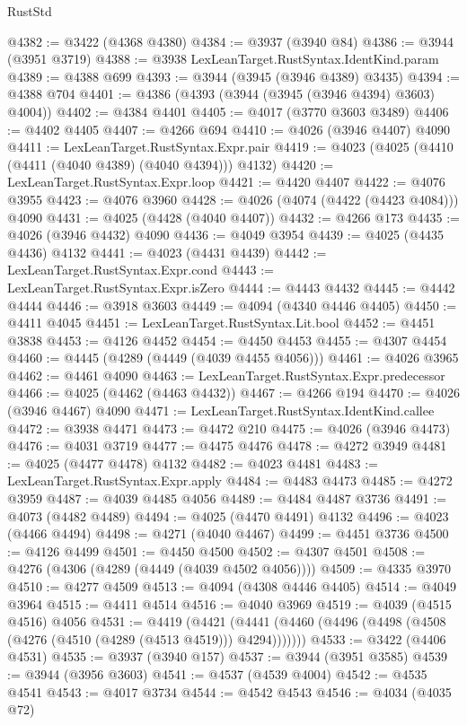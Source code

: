 \begin{lexlean}{RustStd}
\begin{coremodule}
@4382 := @3422 (@4368 @4380)
@4384 := @3937 (@3940 @84)
@4386 := @3944 (@3951 @3719)
@4388 := @3938 LexLeanTarget.RustSyntax.IdentKind.param
@4389 := @4388 @699
@4393 := @3944 (@3945 (@3946 @4389) @3435)
@4394 := @4388 @704
@4401 := @4386 (@4393 (@3944 (@3945 (@3946 @4394) @3603) @4004))
@4402 := @4384 @4401
@4405 := @4017 (@3770 @3603 @3489)
@4406 := @4402 @4405
@4407 := @4266 @694
@4410 := @4026 (@3946 @4407) @4090
@4411 := LexLeanTarget.RustSyntax.Expr.pair
@4419 := @4023 (@4025 (@4410 (@4411 (@4040 @4389) (@4040 @4394))) @4132)
@4420 := LexLeanTarget.RustSyntax.Expr.loop
@4421 := @4420 @4407
@4422 := @4076 @3955
@4423 := @4076 @3960
@4428 := @4026 (@4074 (@4422 (@4423 @4084))) @4090
@4431 := @4025 (@4428 (@4040 @4407))
@4432 := @4266 @173
@4435 := @4026 (@3946 @4432) @4090
@4436 := @4049 @3954
@4439 := @4025 (@4435 @4436) @4132
@4441 := @4023 (@4431 @4439)
@4442 := LexLeanTarget.RustSyntax.Expr.cond
@4443 := LexLeanTarget.RustSyntax.Expr.isZero
@4444 := @4443 @4432
@4445 := @4442 @4444
@4446 := @3918 @3603
@4449 := @4094 (@4340 @4446 @4405)
@4450 := @4411 @4045
@4451 := LexLeanTarget.RustSyntax.Lit.bool
@4452 := @4451 @3838
@4453 := @4126 @4452
@4454 := @4450 @4453
@4455 := @4307 @4454
@4460 := @4445 (@4289 (@4449 (@4039 @4455 @4056)))
@4461 := @4026 @3965
@4462 := @4461 @4090
@4463 := LexLeanTarget.RustSyntax.Expr.predecessor
@4466 := @4025 (@4462 (@4463 @4432))
@4467 := @4266 @194
@4470 := @4026 (@3946 @4467) @4090
@4471 := LexLeanTarget.RustSyntax.IdentKind.callee
@4472 := @3938 @4471
@4473 := @4472 @210
@4475 := @4026 (@3946 @4473)
@4476 := @4031 @3719
@4477 := @4475 @4476
@4478 := @4272 @3949
@4481 := @4025 (@4477 @4478) @4132
@4482 := @4023 @4481
@4483 := LexLeanTarget.RustSyntax.Expr.apply
@4484 := @4483 @4473
@4485 := @4272 @3959
@4487 := @4039 @4485 @4056
@4489 := @4484 @4487 @3736
@4491 := @4073 (@4482 @4489)
@4494 := @4025 (@4470 @4491) @4132
@4496 := @4023 (@4466 @4494)
@4498 := @4271 (@4040 @4467)
@4499 := @4451 @3736
@4500 := @4126 @4499
@4501 := @4450 @4500
@4502 := @4307 @4501
@4508 := @4276 (@4306 (@4289 (@4449 (@4039 @4502 @4056))))
@4509 := @4335 @3970
@4510 := @4277 @4509
@4513 := @4094 (@4308 @4446 @4405)
@4514 := @4049 @3964
@4515 := @4411 @4514
@4516 := @4040 @3969
@4519 := @4039 (@4515 @4516) @4056
@4531 := @4419
    (@4421 (@4441 (@4460 (@4496 (@4498 (@4508 (@4276 (@4510 (@4289 (@4513 @4519))) @4294)))))))
@4533 := @3422 (@4406 @4531)
@4535 := @3937 (@3940 @157)
@4537 := @3944 (@3951 @3585)
@4539 := @3944 (@3956 @3603)
@4541 := @4537 (@4539 @4004)
@4542 := @4535 @4541
@4543 := @4017 @3734
@4544 := @4542 @4543
@4546 := @4034 (@4035 @72)

\end{coremodule}
\end{lexlean}
